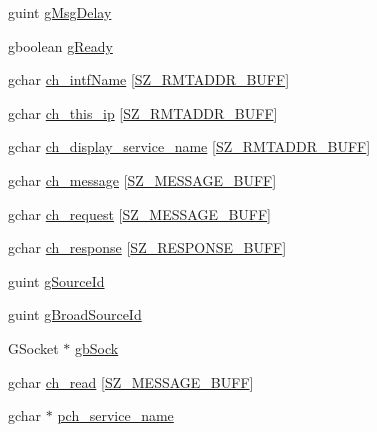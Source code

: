 \begin{DoxyCompactItemize}
\item 
guint \hyperlink{struct__control_data_a277ea878a8491fa38269b6c762a05389}{g\+Msg\+Delay}
\item 
gboolean \hyperlink{struct__control_data_a04238362a20b6616913d869fc464e4b2}{g\+Ready}
\item 
gchar \hyperlink{struct__control_data_adac6cf5482e4bbabb442f8ab27e4bc62}{ch\+\_\+intf\+Name} \mbox{[}\hyperlink{gtk_d_s_8c_a152ca8fa1a2eac39d1badafb6c6cef8c}{S\+Z\+\_\+\+R\+M\+T\+A\+D\+D\+R\+\_\+\+B\+U\+F\+F}\mbox{]}
\item 
gchar \hyperlink{struct__control_data_ac48fc4263dd4a6bad484b93fbf1ffe1b}{ch\+\_\+this\+\_\+ip} \mbox{[}\hyperlink{gtk_d_s_8c_a152ca8fa1a2eac39d1badafb6c6cef8c}{S\+Z\+\_\+\+R\+M\+T\+A\+D\+D\+R\+\_\+\+B\+U\+F\+F}\mbox{]}
\item 
gchar \hyperlink{struct__control_data_a94aa04264eafaa65a7a869a540bbdf93}{ch\+\_\+display\+\_\+service\+\_\+name} \mbox{[}\hyperlink{gtk_d_s_8c_a152ca8fa1a2eac39d1badafb6c6cef8c}{S\+Z\+\_\+\+R\+M\+T\+A\+D\+D\+R\+\_\+\+B\+U\+F\+F}\mbox{]}
\item 
gchar \hyperlink{struct__control_data_a16162d5fe851704d7ea50ff16525b94c}{ch\+\_\+message} \mbox{[}\hyperlink{gtk_d_s_8c_ab5903aa853c3769389e570c8490feb1e}{S\+Z\+\_\+\+M\+E\+S\+S\+A\+G\+E\+\_\+\+B\+U\+F\+F}\mbox{]}
\item 
gchar \hyperlink{struct__control_data_a948c37bbe26f5bdd4841b65384155edf}{ch\+\_\+request} \mbox{[}\hyperlink{gtk_d_s_8c_ab5903aa853c3769389e570c8490feb1e}{S\+Z\+\_\+\+M\+E\+S\+S\+A\+G\+E\+\_\+\+B\+U\+F\+F}\mbox{]}
\item 
gchar \hyperlink{struct__control_data_a9423e8582b05e2dde58b7302bee5559b}{ch\+\_\+response} \mbox{[}\hyperlink{gtk_d_s_8c_a3c73a8961a16a0dfbb87b5a7317bacd2}{S\+Z\+\_\+\+R\+E\+S\+P\+O\+N\+S\+E\+\_\+\+B\+U\+F\+F}\mbox{]}
\item 
guint \hyperlink{struct__control_data_a719187f5c3c94da5aa08616db7820b98}{g\+Source\+Id}
\item 
guint \hyperlink{struct__control_data_ae9e5e76959a76812d94ee8f83ae2eef5}{g\+Broad\+Source\+Id}
\item 
G\+Socket $\ast$ \hyperlink{struct__control_data_a3023250e01849cb311a7207746a3b64e}{gb\+Sock}
\item 
gchar \hyperlink{struct__control_data_a243b075becb92f2f37f56f60f738efb1}{ch\+\_\+read} \mbox{[}\hyperlink{gtk_d_s_8c_ab5903aa853c3769389e570c8490feb1e}{S\+Z\+\_\+\+M\+E\+S\+S\+A\+G\+E\+\_\+\+B\+U\+F\+F}\mbox{]}
\item 
gchar $\ast$ \hyperlink{struct__control_data_a2197fd3d9315510193866dbedbd3cc8b}{pch\+\_\+service\+\_\+name}

\end{DoxyCompactItemize}
